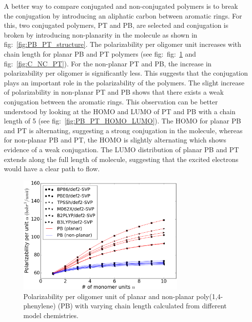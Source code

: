 
A better way to compare conjugated and non-conjugated polymers is to break the conjugation by introducing an aliphatic carbon between aromatic rings. For this, two conjugated polymers, PT and PB, are selected and conjugation is broken by introducing non-planarity in the molecule as shown in fig:\ \ref{fig:PB_PT_structure}. The polarizability per oligomer unit increases with chain length for planar PB and PT polymers (see fig:\ fig:\ \ref{fig:C_NC_PB} and fig:\ \ref{fig:C_NC_PT}). For the non-planar PT and PB, the increase in polarizability per oligomer is significantly less. This suggests that the conjugation plays an important role in the polarizability of the polymers. The slight increase of polarizability in non-planar PT and PB shows that there exists a weak conjugation between the aromatic rings. This observation can be better understood by looking at the HOMO and LUMO of PT and PB with a chain length of 5 (see fig:\ \ref{fig:PB_PT_HOMO_LUMO}). The HOMO for planar PB and PT is alternating, suggesting a strong conjugation in the molecule, whereas for non-planar PB and PT, the HOMO is slightly alternating which shows evidence of a weak conjugation. The LUMO distribution of planar PB and PT extends along the full length of molecule, suggesting that the excited electrons would have a clear path to flow. 

\begin{figure}[htbp] 
	\centering
	\includegraphics[width=0.744\textwidth]{Chapter-3/Figures/C_NC_PB.eps}
	\caption{Polarizability per oligomer unit of planar and non-planar poly(1,4-phenylene) (PB) with varying chain length calculated from different model chemistries.} 
	\label{fig:C_NC_PB} 
\end{figure}  

